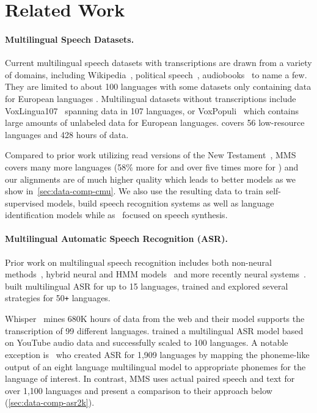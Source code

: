 \section{Related Work}

\paragraph{Multilingual Speech Datasets.} 
Current multilingual speech datasets with transcriptions are drawn from a variety of domains, including Wikipedia~\citep{ardila2019common,conneau2022fleurs}, political speech~\citep{wang2021voxpopuli}, audiobooks~\citep{pratap2020mls} to name a few.  
They are limited to about 100 languages with some datasets only containing data for European languages \citep{wang2021voxpopuli,pratap2020mls}.
Multilingual datasets without transcriptions include VoxLingua107~\citep{valk2020voxlingua} spanning data in 107 languages, or VoxPopuli~\citep{wang2021voxpopuli} which contains large amounts of unlabeled data for European languages.
\citet{leong2022bloom} covers 56 low-resource languages and 428 hours of data.

Compared to prior work utilizing read versions of the New Testament~\cite{black2019cmu}, MMS covers many more languages (58\% more for \MMS{} and over five times more for \GRN{}) and our alignments are of much higher quality which leads to better models as we show in~\textsection\ref{sec:data-comp-cmu}.
We also use the resulting data to train self-supervised models, build speech recognition systems as well as language identification models while as~\citet{black2019cmu} focused on speech synthesis.



\paragraph{Multilingual Automatic Speech Recognition (ASR).}
Prior work on multilingual speech recognition includes both non-neural methods~\citep{burget2010multilingual,lin2009study}, hybrid neural and HMM models~\citep{heigold2013multilingual} and more recently neural systems~\citep{cho2018multilingual,toshniwal2018multilingual,kannan2019mult,li2019bytes}.
\citet{boli2021scaling} built multilingual ASR for up to 15 languages, \citet{Pratap2020multiasr,lugosch2022icassp, tjandra2022massively} trained and explored several strategies for 50\texttt{+} languages. 

Whisper~\citep{radford2022whisper} mines 680K hours of data from the web and their model supports the transcription of 99 different languages. 
\cite{zhang2023usm} trained a multilingual ASR model based on YouTube audio data and successfully scaled to 100 languages. 
A notable exception is~\citet{li2022asr2k} who created ASR for 1,909 languages by mapping the phoneme-like output of an eight language multilingual model to appropriate phonemes for the language of interest. 
In contrast, MMS uses actual paired speech and text for over 1,100 languages and present a comparison to their approach below (\textsection\ref{sec:data-comp-asr2k}).



